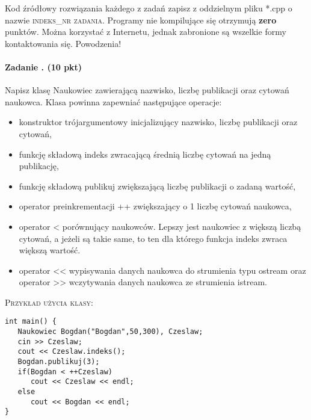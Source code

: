 \documentclass[12pt]{article}
\newcounter{zadanie}
\newcommand{\zadanie}{\stepcounter{zadanie}\paragraph*{Zadanie \arabic{zadanie}. (10 pkt)}}
\begin{document}
\small Kod źródłowy rozwiązania każdego z zadań zapisz z oddzielnym pliku *.cpp o nazwie \textsc{indeks}\_\textsc{nr zadania}. Programy nie kompilujące się otrzymują {\bf zero} punktów. Można korzystać z Internetu, jednak zabronione są wszelkie formy kontaktowania się. Powodzenia!

\zadanie
Napisz klasę \textsf{Naukowiec} zawierającą nazwisko, liczbę publikacji oraz cytowań naukowca. Klasa powinna zapewniać następujące operacje:
\begin{itemize}
\item konstruktor trójargumentowy inicjalizujący nazwisko, liczbę publikacji oraz cytowań,
\item funkcję składową \textsf{indeks} zwracającą średnią liczbę cytowań na jedną publikację,
\item funkcję składową \textsf{publikuj} zwiększającą liczbę publikacji o zadaną wartość,
\item operator preinkrementacji \textsf{++} zwiększający o 1 liczbę cytowań naukowca,
\item operator \textsf{<} porównujący naukowców. Lepszy jest naukowiec z większą liczbą cytowań, a jeżeli są takie same, to ten dla którego funkcja \textsf{indeks} zwraca większą wartość.
\item operator \textsf{<<} wypisywania danych naukowca do strumienia typu \textsf{ostream} oraz operator \textsf{>>} wczytywania danych naukowca ze strumienia \textsf{istream}.
\end{itemize}
\textsc{Przykład użycia klasy:}
\begin{verbatim}
int main() {
   Naukowiec Bogdan("Bogdan",50,300), Czeslaw;
   cin >> Czeslaw;
   cout << Czeslaw.indeks();
   Bogdan.publikuj(3);
   if(Bogdan < ++Czeslaw)
      cout << Czeslaw << endl;
   else
      cout << Bogdan << endl;
}
\end{verbatim}
\end{document}
